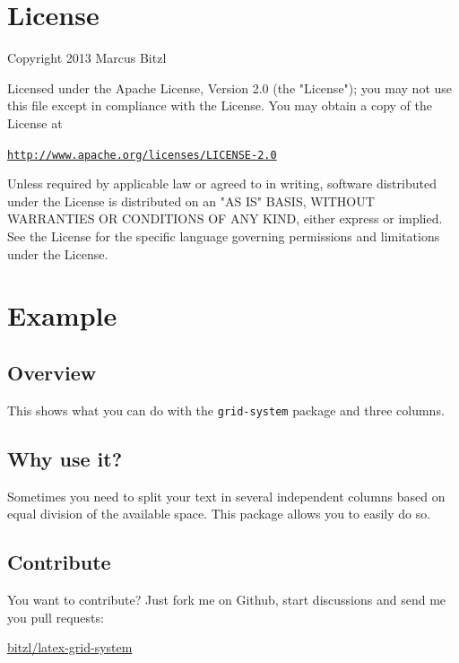 \documentclass[DIV13,a4paper]{scrartcl}
\begin{document}
	
	
	\section{License}
	Copyright 2013 Marcus Bitzl
	
	\medskip
	
	Licensed under the Apache License, Version 2.0 (the "License");
	you may not use this file except in compliance with the License.
	You may obtain a copy of the License at
	
	\medskip
	
	\hspace*{1.2em}\href{http://www.apache.org/licenses/LICENSE-2.0}{\texttt{http://www.apache.org/licenses/LICENSE-2.0}}
	
	\medskip
	
	Unless required by applicable law or agreed to in writing, software
	distributed under the License is distributed on an "AS IS" BASIS,
	WITHOUT WARRANTIES OR CONDITIONS OF ANY KIND, either express or implied.
	See the License for the specific language governing permissions and
	limitations under the License.
	
	
	\section{Example}
	\begin{row}[cellsep=0.75cm]{3}{3}
		\begin{cell}{1}
			\section*{Overview}
			\vspace{-1.5ex}
			This shows what you can do with the \texttt{grid-system} package and three columns.
		\end{cell}
		\begin{cell}{1}
			\section*{Why use it?}
			\vspace{-1.5ex}
			Sometimes you need to split your text in several independent columns based on equal division of the available space. This package allows you to easily do so.
		\end{cell}
		\begin{cell}{1}
			\section*{Contribute}
			\vspace{-1.5ex}
			You want to contribute? Just fork me on Github, start discussions and send me you pull requests: 
			\begin{center}
				\href{https://github.com/bitzl/latex-grid-system}{\ttfamily bitzl/latex-grid-system}
			\end{center}
		\end{cell}
	\end{row}
	
\end{document}
